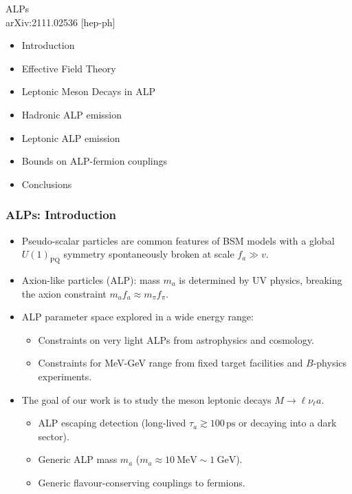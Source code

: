 \documentclass[mathserif, 10pt]{beamer}
\begin{document}
\begin{frame}[plain] %
    \begin{block}{{\Large ALPs}\\arXiv:2111.02536 [hep-ph]}
        \begin{itemize}
            \item Introduction
            \item Effective Field Theory
            \item Leptonic Meson Decays in ALP
            \item Hadronic ALP emission
            \item Leptonic ALP emission
            \item Bounds on ALP-fermion couplings
            \item Conclusions
        \end{itemize}
    \end{block}
\end{frame}

\begin{frame}\frametitle{ALPs: Introduction}
    \begin{itemize}
        \item Pseudo-scalar particles are common features of BSM models with a global $U(1)_\mathrm{PQ}$ symmetry spontaneously broken at scale $f_a \gg v$.
        \item Axion-like particles (ALP): mass $m_a$ is determined by UV physics, breaking the axion constraint $m_a f_a \approx m_\pi f_\pi$.
        \item ALP parameter space explored in a wide energy range:
              \begin{itemize}
                  \item Constraints on very light ALPs from astrophysics and cosmology.
                  \item Constraints for MeV-GeV range from fixed target facilities and $B$-physics experiments.
              \end{itemize}
        \item The goal of our work is to study the meson leptonic decays $M\to \ell \nu_\ell a$.
              \begin{itemize}
                  \item ALP escaping detection (long-lived $\tau_a \gtrsim 100\,\mathrm{ps} $ or decaying into a dark sector).
                  \item Generic ALP mass $m_a$ ($m_a \approx 10\ \mathrm{MeV}\sim 1\ \mathrm{GeV}$).
                  \item Generic flavour-conserving couplings to fermions.
              \end{itemize}
    \end{itemize}
\end{frame}
\end{document}
